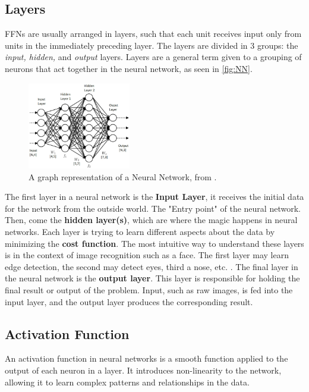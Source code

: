 \documentclass{article}
\begin{document}
\subsection{Layers}
\label{sub:Layers}
FFNs are usually arranged in layers, such that each unit receives input
only from units in the immediately preceding layer. The layers are divided in 3 groups: the \textit{input, hidden,} and \textit{output} layers. Layers are a general term given to a grouping of neurons that act together in the neural network, as seen in \autoref{fig:NN}. 
  \begin{figure} %
    \centering
    \includegraphics[width=0.4\textwidth]{NeuralNetwork}
    \caption{A graph representation of a Neural Network, from \cite{inbook:Aggarwal-1.2}.}
  \label{fig:NN}
\end{figure}

The first layer in a neural network is the \textbf{Input Layer}, it receives the initial data for the network from the outside world. The "Entry point" of the neural network. Then, come the \textbf{hidden layer(s)}, which are where the magic happens in neural networks. Each layer is trying to learn different aspects about the data by minimizing the \textbf{cost function}. The most intuitive way to understand these layers is in the context of image recognition such as a face. The first layer may learn edge detection, the second may detect eyes, third a nose, etc. \citep{layers}. The final layer in the neural network is the \textbf{output layer}. This layer is responsible for holding the final result or output of the problem. Input, such as raw images, is fed into the input layer, and the output layer produces the corresponding result.


\subsection{Activation Function}%
  \label{sub:ActivationFunction}
An activation function in neural networks is a smooth function applied to the output of each neuron in a layer. It introduces non-linearity to the network, allowing it to learn complex patterns and relationships in the data.
\end{document}

